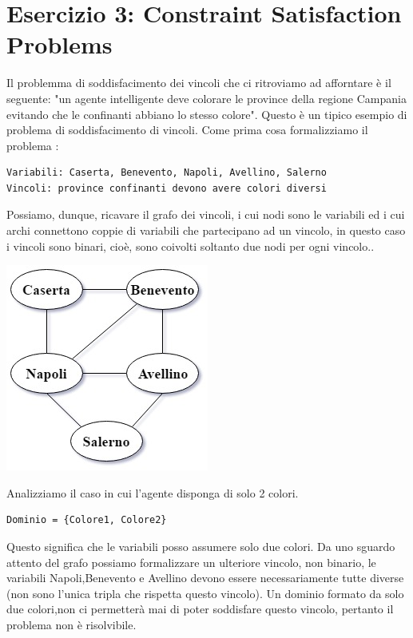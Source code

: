 	\section{Esercizio 3: Constraint Satisfaction Problems}
		\label{sec:es3}
		Il problemma di soddisfacimento dei vincoli che ci ritroviamo ad afforntare è il seguente: "un agente intelligente  deve colorare le province della regione Campania evitando che le confinanti abbiano lo stesso colore". Questo è un tipico esempio di problema di soddisfacimento di vincoli. Come prima cosa formalizziamo il problema :
		\begin{lstlisting}
Variabili: Caserta, Benevento, Napoli, Avellino, Salerno
Vincoli: province confinanti devono avere colori diversi
		\end{lstlisting}
		Possiamo, dunque, ricavare il grafo dei vincoli, i cui nodi sono le variabili ed i cui archi connettono coppie di variabili che partecipano ad un vincolo, in questo caso i vincoli sono binari, cioè, sono coivolti soltanto due nodi per ogni vincolo..
		\begin{center}
			\includegraphics[scale=0.7]{ConstraintGraph.jpg}
		\end{center}
		Analizziamo il caso in cui l'agente disponga di solo 2 colori.
		\begin{lstlisting}
Dominio = {Colore1, Colore2}
		\end{lstlisting}
		Questo significa che le variabili posso assumere solo due colori.
		Da uno sguardo attento del grafo possiamo formalizzare un ulteriore vincolo, non binario, le variabili Napoli,Benevento e Avellino devono essere necessariamente tutte diverse (non sono l'unica tripla che rispetta questo vincolo).
		Un dominio formato da solo due colori,non ci permetterà mai di poter soddisfare questo vincolo, pertanto il problema non è risolvibile. 
